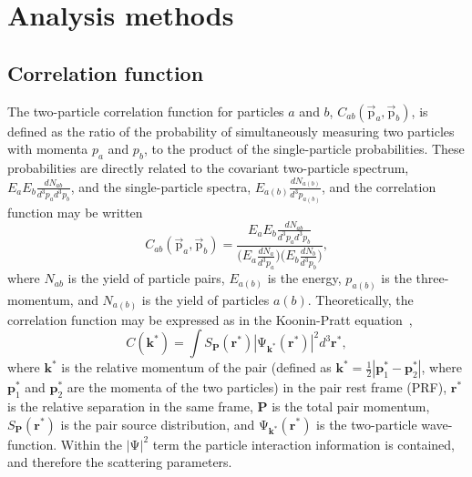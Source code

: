 \documentclass{svproc}
\begin{document}
\section{Analysis methods}
\label{sec:AnalysisMethods}

\subsection{Correlation function}
\label{sec:CorrelationFunction}
The two-particle correlation function for particles $a$ and $b$, $C_{ab}(\vec{\mathrm{p}}_{a},\vec{\mathrm{p}}_{b})$, is defined as the ratio of the probability of simultaneously measuring two particles with momenta $p_{a}$ and $p_{b}$, to the product of the single-particle probabilities.
These probabilities are directly related to the covariant two-particle spectrum, $E_{a}E_{b}\frac{dN_{ab}}{d^{3}p_{a}d^{3}p_{b}}$, and the single-particle spectra, $E_{a(b)}\frac{dN_{a(b)}}{d^{3}p_{a(b)}}$, and the correlation function may be written
\begin{equation}
  C_{ab}(\vec{\mathrm{p}}_{a},\vec{\mathrm{p}}_{b}) = \frac{E_{a}E_{b}\frac{dN_{ab}}{d^{3}p_{a}d^{3}p_{b}}}{\big( E_{a}\frac{dN_{a}}{d^{3}p_{a}} \big) \big( E_{b}\frac{dN_{b}}{d^{3}p_{b}} \big)},
\label{eqn:CfRatioSpectra}
\end{equation}
where $N_{ab}$ is the yield of particle pairs, $E_{a(b)}$ is the energy, $p_{a(b)}$ is the three-momentum, and $N_{a(b)}$ is the yield of particles $a(b)$.
Theoretically, the correlation function may be expressed as in the Koonin-Pratt equation~\cite{Koonin:1977fh,Pratt:1990zq},
\begin{equation}
 C(\mathbf{k^{*}}) = \int S_{\mathbf{P}}(\mathbf{r^{*}})|\mathrm{\Psi}_{\mathbf{k^{*}}}(\mathbf{r^{*}})|^{2}d^{3}\mathbf{r^{*}},
\label{eqn:KooninPrattEqn}
\end{equation}
where $\mathbf{k}^{*}$ is the relative momentum of the pair (defined as $\mathbf{k}^{*} = \frac{1}{2}|\mathbf{p}_{1}^{*}-\mathbf{p}_{2}^{*}|$, where $\mathbf{p}_{1}^{*}$ and $\mathbf{p}_{2}^{*}$ are the momenta of the two particles) in the pair rest frame (PRF), $\mathbf{r}^{*}$ is the relative separation in the same frame, $\mathbf{P}$ is the total pair momentum, $S_{\mathbf{P}}(\mathbf{r^{*}})$ is the pair source distribution, and $\mathrm{\Psi}_{\mathbf{k^{*}}}(\mathbf{r^{*}})$ is the two-particle wave-function.
Within the $|\mathrm{\Psi}|^{2}$ term the particle interaction information is contained, and therefore the scattering parameters.
\end{document}

